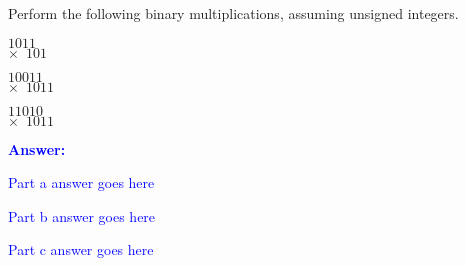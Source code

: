 \item{}
Perform the following binary multiplications, assuming unsigned integers.
\begin{list}{\textbf{}}{}
    \item\noindent\phantom{$\times$}$1011$\\
    \underline{$\times\phantom{1}101$}\\
    \item\noindent\phantom{$\times$}$10011$\\
    \underline{$\times\phantom{1}1011$}\\
    \item\noindent\phantom{$\times$}$11010$\\
    \underline{$\times\phantom{1}1011$}\\
\end{list}
\vskip12pt
\ifanswers
\textcolor{blue}{
\textbf{Answer:}\\
\begin{list}{\textbf{}}{}
    \item Part a answer goes here
    \item Part b answer goes here
    \item Part c answer goes here
\end{list}
}
\newpage
\fi
